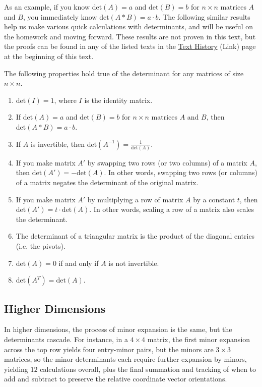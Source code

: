 \documentclass{ximera}
\begin{document}
As an example, if you know $\mbox{det}(A)=a$ and $\mbox{det}(B)=b$ for $n\times n$ matrices $A$ and $B$, you immediately know $\mbox{det}(A*B)=a\cdot b$. The following similar results help us make various quick calculations with determinants, and will be useful on the homework and moving forward. These results are not proven in this text, but the proofs can be found in any of the listed texts in the \href{https://ximera.osu.edu/appliedlinearalgebra/a1Copyright/learningActivities/m0Copyright/textHistory}{Text History} (Link) page at the beginning of this text.

\begin{theorem}
    The following properties hold true of the determinant for any matrices of size $n\times n$.
    \begin{enumerate}
        \item $\mbox{det}(I)=1$, where $I$ is the identity matrix.
        \item If $\mbox{det}(A)=a$ and $\mbox{det}(B)=b$ for $n\times n$ matrices $A$ and $B$, then $\mbox{det}(A*B)=a\cdot b$.
        \item If $A$ is invertible, then $\mbox{det}(A^{-1})=\frac{1}{\mbox{det}(A)}$.
        \item If you make matrix $A'$ by swapping two rows (or two columns) of a matrix $A$, then $\mbox{det}(A')=-\mbox{det}(A)$. In other words, swapping two rows (or columns) of a matrix negates the determinant of the original matrix. 
        \item If you make matrix $A'$ by multiplying a row of matrix $A$ by a constant $t$, then $\mbox{det}(A')=t\cdot \mbox{det}(A)$. In other words, scaling a row of a matrix also scales the determinant.
        \item The determinant of a triangular matrix is the product of the diagonal entries (i.e. the pivots).
        \item $\mbox{det}(A)=0$ if and only if $A$ is not invertible.
        \item $\mbox{det}(A^T)=\mbox{det}(A)$.
    \end{enumerate}
\end{theorem}

\subsection*{Higher Dimensions}

In higher dimensions, the process of minor expansion is the same, but the determinants cascade. For instance, in a $4\times 4$ matrix, the first minor expansion across the top row yields four entry-minor pairs, but the minors are $3\times 3$ matrices, so the minor determinants each require further expansion by minors, yielding $12$ calculations overall, plus the final summation and tracking of when to add and subtract to preserve the relative coordinate vector orientations.
\end{document}
